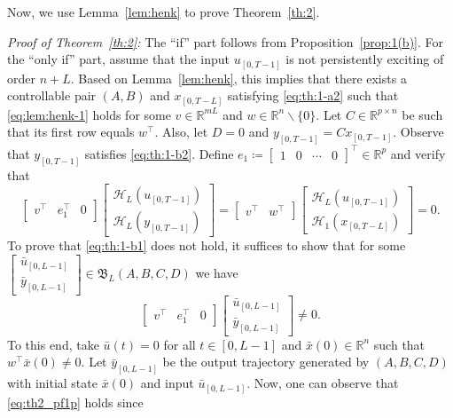 \documentclass[journal,twoside,web]{ieeecolor}
\begin{document}
Now, we use Lemma~\ref{lem:henk} to prove Theorem~\ref{th:2}. 

\textit{Proof of Theorem~\ref{th:2}:} 
The ``if'' part follows from Proposition~\ref{prop:1(b)}. For the ``only if'' part, assume that the input $u_{[0,T-1]}$ is not persistently exciting of order $n+L$. Based on Lemma~\ref{lem:henk}, this implies that there exists a controllable pair $(A,B)$ and $x_{[0,T-L]}$ satisfying \eqref{eq:th:1-a2} such that \eqref{eq:lem:henk-1} holds for some $v\in\mathbb{R}^{mL}$ and $w\in\mathbb{R}^n\backslash\{0\}$. Let $C\in\mathbb{R}^{p\times n}$ be such that its first row equals $w^\top$. Also, let $D=0$ and \mbox{$y_{[0,T-1]}=Cx_{[0,T-1]}$}. Observe that $y_{[0,T-1]}$ satisfies \eqref{eq:th:1-b2}. Define $e_1\coloneqq\begin{bmatrix}
1 & 0 & \cdots & 0
\end{bmatrix}^\top\in\mathbb{R}^p$ and verify that
\begin{equation}
\label{eq:th2_pf1}
\begin{bmatrix}
v^\top \!\!&\!\! e_1^\top \!\!&\!\! 0
\end{bmatrix}\!\!\begin{bmatrix}
\mathcal{H}_L(u_{[0,T-1]}) \\ \mathcal{H}_L(y_{[0,T-1]})
\end{bmatrix}\!=\!\begin{bmatrix}
v^\top \!\!&\!\! w^\top 
\end{bmatrix}\!\!\begin{bmatrix}
\mathcal{H}_L(u_{[0,T-1]}) \\ \mathcal{H}_1(x_{[0,T-L]})
\end{bmatrix}\!\!=\!0.
\end{equation}
To prove that \eqref{eq:th:1-b1} does not hold, it suffices to show that for some $\begin{bmatrix}
\bar{u}_{[0,L-1]} \\ \bar{y}_{[0,L-1]}
\end{bmatrix}\in\mathfrak{B}_L(A,B,C,D)$ we have
\begin{equation}
\label{eq:th2_pf1p}
\begin{bmatrix}
v^\top & e_1^\top & 0 
\end{bmatrix}\begin{bmatrix}
\bar{u}_{[0,L-1]} \\ \bar{y}_{[0,L-1]}
\end{bmatrix}\neq 0.
\end{equation}
To this end, take $\bar{u}(t)=0$ for all $t\in[0,L-1]$ and $\bar{x}(0)\in\mathbb{R}^n$ such that $w^\top \bar{x}(0)\neq 0$. Let $\bar{y}_{[0,L-1]}$ be the output trajectory generated by $(A,B,C,D)$ with initial state $\bar{x}(0)$ and input $\bar{u}_{[0,L-1]}$. Now, one can observe that \eqref{eq:th2_pf1p} holds since
\end{document}
